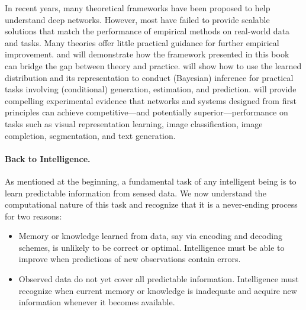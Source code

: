 \documentclass[../../book-main.tex]{subfiles}
\begin{document}
In recent years, many theoretical frameworks have been proposed to
help understand deep networks. However, most have failed to provide
scalable solutions that match the performance of empirical methods on
real-world data and tasks. Many theories offer little practical
guidance for further empirical improvement.
 and  will
demonstrate how the framework presented in this book can bridge the
gap between theory and practice.  will
show how to use the learned distribution and its representation to
conduct (Bayesian) inference for practical tasks involving
(conditional) generation, estimation, and prediction.
 will provide compelling experimental evidence
that networks and systems designed from first principles can achieve
competitive---and potentially superior---performance on tasks such as
visual representation learning, image classification, image
completion, segmentation, and text generation.

\paragraph{Back to Intelligence.}
As mentioned at the beginning, a fundamental task of any intelligent
being is to learn predictable information from sensed data. We now
understand the computational nature of this task and recognize that
it is a never-ending process for two reasons:
\begin{itemize}
    \item Memory or knowledge learned from data, say via encoding and decoding
        schemes, is unlikely to be correct or optimal. Intelligence
        must be able to improve when predictions of new observations
        contain errors.
    \item Observed data do not yet cover all predictable information.
        Intelligence must recognize when current memory or  knowledge is
        inadequate and acquire new information whenever it becomes available.
\end{itemize}
\end{document}
